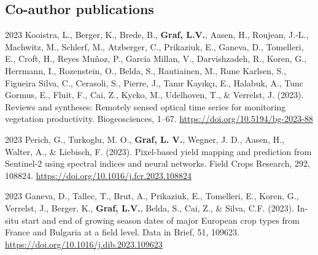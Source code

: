 \begin{cv}{}
\begin{cvlist}{}
\end{cvlist}

\subsection{Co-author publications}

\begin{cvlist}

    \item[2023]
    Kooistra, L., Berger, K., Brede, B., \textbf{Graf, L.V.}, Aasen, H., Roujean, J.-L., Machwitz, M., Schlerf, M., Atzberger, C., Prikaziuk, E., Ganeva, D., Tomelleri, E., Croft, H., Reyes Muñoz, P., Garcia Millan, V., Darvishzadeh, R., Koren, G., Herrmann, I., Rozenstein, O., Belda, S., Rautiainen, M., Rune Karlsen, S., Figueira Silva, C., Cerasoli, S., Pierre, J., Tanır Kayıkçı, E., Halabuk, A., Tunc Gormus, E., Fluit, F., Cai, Z., Kycko, M., Udelhoven, T., \& Verrelst, J. (2023). Reviews and syntheses: Remotely sensed optical time series for monitoring vegetation productivity. Biogeosciences, 1–67. \url{https://doi.org/10.5194/bg-2023-88}

    \item[2023]
    Perich, G., Turkoglu, M. O., \textbf{Graf, L. V.}, Wegner, J. D., Aasen, H., Walter, A., \& Liebisch, F. (2023). Pixel-based yield mapping and prediction from Sentinel-2 using spectral indices and neural networks. Field Crops Research, 292, 108824. \url{https://doi.org/10.1016/j.fcr.2023.108824}

    \item[2023]
    Ganeva, D., Tallec, T., Brut, A., Prikaziuk, E., Tomelleri, E., Koren, G., Verrelst, J., Berger, K., \textbf{Graf, L.V.}, Belda, S., Cai, Z., \& Silva, C.F. (2023). In-situ start and end of growing season dates of major European crop types from France and Bulgaria at a field level. Data in Brief, 51, 109623. \url{https://doi.org/10.1016/j.dib.2023.109623}



 
\end{cvlist}

\end{cv}
